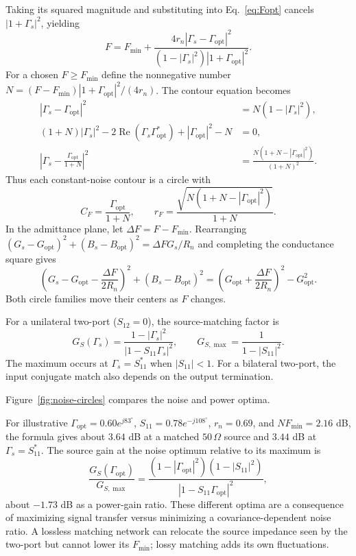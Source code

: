 Taking its squared magnitude and substituting into Eq.~\eqref{eq:Fopt} cancels $|1+\Gamma_s|^2$, yielding
\begin{equation}
\boxed{F=F_{\min}+\frac{4r_n|\Gamma_s-\Gamma_{\mathrm{opt}}|^2}
{(1-|\Gamma_s|^2)|1+\Gamma_{\mathrm{opt}}|^2}.}
\end{equation}
For a chosen $F\geq F_{\min}$ define the nonnegative number
$N=(F-F_{\min})|1+\Gamma_{\mathrm{opt}}|^2/(4r_n)$. The contour equation becomes
\begin{align*}
|\Gamma_s-\Gamma_{\mathrm{opt}}|^2&=N(1-|\Gamma_s|^2),\\
(1+N)|\Gamma_s|^2-2\operatorname{Re}(\Gamma_s\Gamma_{\mathrm{opt}}^*)
+|\Gamma_{\mathrm{opt}}|^2-N&=0,\\
\left|\Gamma_s-\frac{\Gamma_{\mathrm{opt}}}{1+N}\right|^2
&=\frac{N(1+N-|\Gamma_{\mathrm{opt}}|^2)}{(1+N)^2}.
\end{align*}
Thus each constant-noise contour is a circle with
\[
C_F=\frac{\Gamma_{\mathrm{opt}}}{1+N},\qquad
r_F=\frac{\sqrt{N(1+N-|\Gamma_{\mathrm{opt}}|^2)}}{1+N}.
\]
In the admittance plane, let $\Delta F=F-F_{\min}$. Rearranging
$(G_s-G_{\mathrm{opt}})^2+(B_s-B_{\mathrm{opt}})^2=\Delta F G_s/R_n$ and completing the conductance square gives
\[
\left(G_s-G_{\mathrm{opt}}-\frac{\Delta F}{2R_n}\right)^2
+(B_s-B_{\mathrm{opt}})^2
=\left(G_{\mathrm{opt}}+\frac{\Delta F}{2R_n}\right)^2-G_{\mathrm{opt}}^2.
\]
Both circle families move their centers as $F$ changes.

For a unilateral two-port ($S_{12}=0$), the source-matching factor is
\[
G_S(\Gamma_s)=\frac{1-|\Gamma_s|^2}{|1-S_{11}\Gamma_s|^2},\qquad
G_{S,\max}=\frac1{1-|S_{11}|^2}.
\]
The maximum occurs at $\Gamma_s=S_{11}^*$ when $|S_{11}|<1$. For a bilateral two-port, the input conjugate match also depends on the output termination.

Figure~\ref{fig:noise-circles} compares the noise and power optima.
\NoiseCirclesFigure

For illustrative $\Gamma_{\mathrm{opt}}=0.60e^{j83^\circ}$, $S_{11}=0.78e^{-j108^\circ}$, $r_n=0.69$, and $NF_{\min}=2.16$ dB, the formula gives about $3.64$ dB at a matched $50\,\Omega$ source and $3.44$ dB at $\Gamma_s=S_{11}^*$. The source gain at the noise optimum relative to its maximum is
\[
\frac{G_S(\Gamma_{\mathrm{opt}})}{G_{S,\max}}
=\frac{(1-|\Gamma_{\mathrm{opt}}|^2)(1-|S_{11}|^2)}{|1-S_{11}\Gamma_{\mathrm{opt}}|^2},
\]
about $-1.73$ dB as a power-gain ratio. These different optima are a consequence of maximizing signal transfer versus minimizing a covariance-dependent noise ratio. A lossless matching network can relocate the source impedance seen by the two-port but cannot lower its $F_{\min}$; lossy matching adds its own fluctuations.

